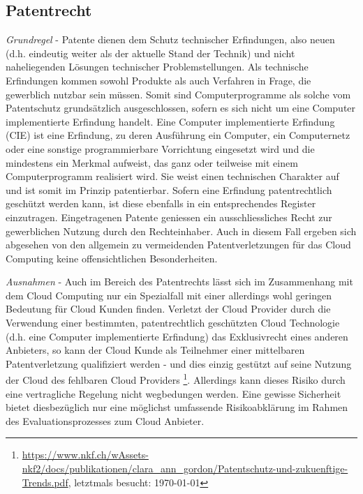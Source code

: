 \documentclass[a4paper,pointlessnumbers]{scrreprt}
\begin{document}
\subsection{Patentrecht}
\textit{Grundregel} - Patente dienen dem Schutz technischer Erfindungen, also neuen (d.h. eindeutig weiter als der aktuelle Stand der Technik) und nicht naheliegenden Lösungen technischer Problemstellungen. Als technische Erfindungen kommen sowohl Produkte als auch Verfahren in Frage, die gewerblich nutzbar sein müssen. Somit sind Computerprogramme als solche vom Patentschutz grundsätzlich ausgeschlossen, sofern es sich nicht um eine Computer implementierte Erfindung handelt. Eine Computer implementierte Erfindung (CIE) ist eine Erfindung, zu deren Ausführung ein Computer, ein Computernetz oder eine sonstige programmierbare Vorrichtung eingesetzt wird und die mindestens ein Merkmal aufweist, das ganz oder teilweise mit einem Computerprogramm realisiert wird. Sie weist einen technischen Charakter auf und ist somit im Prinzip patentierbar. Sofern eine Erfindung patentrechtlich geschützt werden kann, ist diese ebenfalls in ein entsprechendes Register einzutragen. Eingetragenen Patente geniessen ein ausschliessliches Recht zur gewerblichen Nutzung durch den Rechteinhaber. Auch in diesem Fall ergeben sich abgesehen von den allgemein zu vermeidenden Patentverletzungen für das Cloud Computing keine offensichtlichen Besonderheiten.

\textit{Ausnahmen} - Auch im Bereich des Patentrechts lässt sich im Zusammenhang mit dem Cloud Computing nur ein Spezialfall mit einer allerdings wohl geringen Bedeutung für Cloud Kunden finden. Verletzt der Cloud Provider durch die Verwendung einer bestimmten, patentrechtlich geschützten Cloud Technologie (d.h. eine Computer implementierte Erfindung) das Exklusivrecht eines anderen Anbieters, so kann der Cloud Kunde als Teilnehmer einer mittelbaren Patentverletzung qualifiziert werden - und dies einzig gestützt auf seine Nutzung der Cloud des fehlbaren Cloud Providers \footnote{\href{https://www.nkf.ch/wAssets-nkf2/docs/publikationen/clara\_ann\_gordon/Patentschutz-und-zukuenftige-Trends.pdf}{https://www.nkf.ch/wAssets-nkf2/docs/publikationen/clara\_ann\_gordon/Patentschutz-und-zukuenftige-Trends.pdf}, letztmals besucht: \today}. Allerdings kann dieses Risiko durch eine vertragliche Regelung nicht wegbedungen werden. Eine gewisse Sicherheit bietet diesbezüglich nur eine möglichst umfassende Risikoabklärung im Rahmen des Evaluationsprozesses zum Cloud Anbieter.
\end{document}
